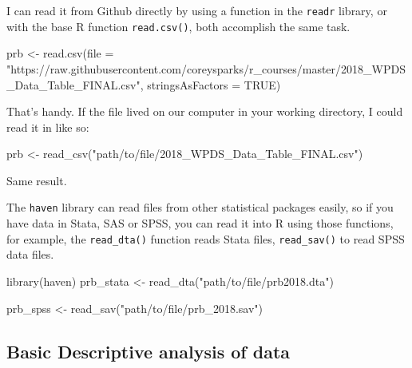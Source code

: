 \documentclass[
]{article}
\newenvironment{Shaded}{\begin{snugshade}}{\end{snugshade}}
\newcommand{\AttributeTok}[1]{\textcolor[rgb]{0.77,0.63,0.00}{#1}}
\newcommand{\ConstantTok}[1]{\textcolor[rgb]{0.00,0.00,0.00}{#1}}
\newcommand{\FunctionTok}[1]{\textcolor[rgb]{0.00,0.00,0.00}{#1}}
\newcommand{\NormalTok}[1]{#1}
\newcommand{\OtherTok}[1]{\textcolor[rgb]{0.56,0.35,0.01}{#1}}
\newcommand{\StringTok}[1]{\textcolor[rgb]{0.31,0.60,0.02}{#1}}
\begin{document}
I can read it from Github directly by using a function in the \texttt{readr}
library, or with the base R function \texttt{read.csv()}, both accomplish the
same task.

\begin{Shaded}
\begin{Highlighting}[]
\NormalTok{prb }\OtherTok{\textless{}{-}} \FunctionTok{read.csv}\NormalTok{(}\AttributeTok{file =} \StringTok{"https://raw.githubusercontent.com/coreysparks/r\_courses/master/2018\_WPDS\_Data\_Table\_FINAL.csv"}\NormalTok{,}
    \AttributeTok{stringsAsFactors =} \ConstantTok{TRUE}\NormalTok{)}
\end{Highlighting}
\end{Shaded}

That's handy. If the file lived on our computer in your working
directory, I could read it in like so:

\begin{Shaded}
\begin{Highlighting}[]
\NormalTok{prb }\OtherTok{\textless{}{-}} \FunctionTok{read\_csv}\NormalTok{(}\StringTok{"path/to/file/2018\_WPDS\_Data\_Table\_FINAL.csv"}\NormalTok{)}
\end{Highlighting}
\end{Shaded}

Same result.

The \texttt{haven} library \citet{haven} can read files from other statistical
packages easily, so if you have data in Stata, SAS or SPSS, you can read
it into R using those functions, for example, the \texttt{read\_dta()} function
reads Stata files, \texttt{read\_sav()} to read SPSS data files.

\begin{Shaded}
\begin{Highlighting}[]
\FunctionTok{library}\NormalTok{(haven)}
\NormalTok{prb\_stata }\OtherTok{\textless{}{-}} \FunctionTok{read\_dta}\NormalTok{(}\StringTok{"path/to/file/prb2018.dta"}\NormalTok{)}

\NormalTok{prb\_spss }\OtherTok{\textless{}{-}} \FunctionTok{read\_sav}\NormalTok{(}\StringTok{"path/to/file/prb\_2018.sav"}\NormalTok{)}
\end{Highlighting}
\end{Shaded}

\hypertarget{basic-descriptive-analysis-of-data}{%
\subsection{Basic Descriptive analysis of data}\label{basic-descriptive-analysis-of-data}}
\end{document}
